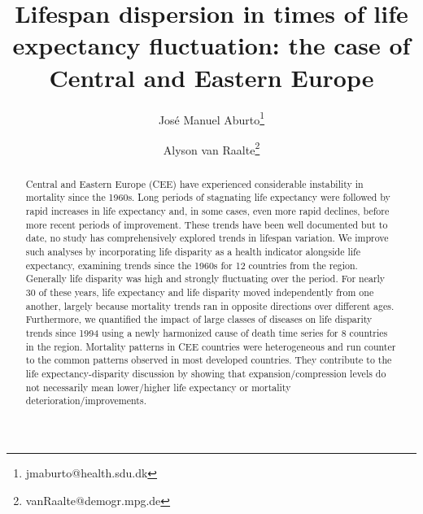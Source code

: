 \documentclass{article}
\title{Lifespan dispersion in times of life expectancy fluctuation: the case of Central and Eastern Europe}
\author[1,2]{Jos\'e Manuel Aburto\thanks{jmaburto@health.sdu.dk}}
\author[2]{Alyson van Raalte\thanks{vanRaalte@demogr.mpg.de}}
\affil[1]{Unit of Biodemography, Department of Public Health, University of Southern Denmark}
\affil[2]{Max Planck Institute for Demographic Research}
\date{}
\begin{document}
\maketitle

\begin{abstract}
Central and Eastern Europe (CEE) have experienced considerable instability in mortality since the 1960s. Long periods of stagnating life expectancy were followed by rapid increases in life expectancy and, in some cases, even more rapid declines, before more recent periods of improvement. These trends have been well documented but to date, no study has comprehensively explored trends in lifespan variation.  We improve such analyses by incorporating life disparity as a health indicator alongside life expectancy, examining trends since the 1960s for 12 countries from the region. Generally life disparity was high and strongly fluctuating over the period. For nearly 30 of these years, life expectancy and life disparity moved independently from one another, largely because mortality trends ran in opposite directions over different ages. Furthermore, we quantified the impact of large classes of diseases on life disparity trends since 1994 using a newly harmonized cause of death time series for 8 countries in the region. Mortality patterns in CEE countries were heterogeneous and run counter to the common patterns observed in most developed countries. They contribute to the life expectancy-disparity discussion by showing that expansion/compression levels do not necessarily mean lower/higher life expectancy or mortality deterioration/improvements.
\end{abstract}


\newpage
\end{document}
